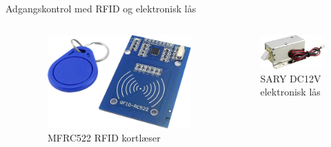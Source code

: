 \documentclass[aspectratio=169]{beamer}
\begin{document}
\begin{frame}{Adgangskontrol med RFID og elektronisk lås}
\begin{columns}
\begin{column}{0.6\textwidth}
	\end{column}
	\begin{column}{0.4\textwidth}
		\centering
		\captionsetup{format=tcbcaptionsmall}
		\begin{columns}
			\begin{column}{0.45\textwidth}
				\begin{figure}[height=0.2\textheight]
  					\includegraphics[height=0.2\textheight,keepaspectratio=true]{assets/pictures/rfid.png}
  					\caption{MFRC522 RFID kortlæser}
  					\label{fig:}
				\end{figure}
			\end{column}
			\begin{column}{0.45\textwidth}
				\begin{figure}[height=0.2\textheight]
  					\includegraphics[height=0.2\textheight,keepaspectratio=true]{assets/pictures/12vdc-lock.png}
  					\caption{SARY DC12V elektronisk lås}
  					\label{fig:12vdc-lock}
				\end{figure}
			\end{column}

\end{columns}
\end{column}
\end{columns}
\end{frame}
\end{document}
